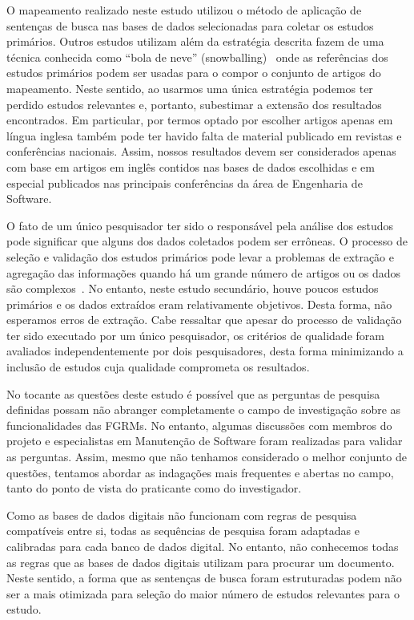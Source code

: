 O mapeamento realizado neste estudo utilizou o método de aplicação de sentenças
de busca nas bases de dados selecionadas para coletar os estudos primários.
Outros estudos utilizam além da estratégia descrita fazem de uma técnica
conhecida  como ``bola de neve'' (snowballing)~\cite{wohlin2014guidelines} onde
as referências dos estudos primários podem ser usadas para o compor o conjunto
de artigos do mapeamento. Neste sentido, ao usarmos uma única estratégia podemos
ter perdido estudos relevantes e, portanto, subestimar a extensão dos resultados
encontrados. Em particular, por termos optado por escolher artigos apenas em
língua inglesa também pode ter havido falta de material publicado em revistas e
conferências nacionais. Assim, nossos resultados devem ser considerados apenas
com base em artigos em inglês contidos nas bases de dados escolhidas  e em
especial publicados nas principais conferências da área de Engenharia de
Software.

O fato de um único pesquisador ter sido o responsável pela análise dos estudos
pode significar que alguns dos dados coletados podem ser errôneas. O processo de
seleção e validação dos estudos primários pode levar a problemas de extração e
agregação das informações quando há um grande número de artigos ou os dados são
complexos~\cite{keele2007guidelines}. No entanto, neste estudo secundário, houve
poucos estudos primários e os dados extraídos eram relativamente objetivos.
Desta forma, não esperamos erros de extração. Cabe ressaltar que apesar do
processo de validação ter sido executado por um único pesquisador, os critérios
de qualidade foram avaliados independentemente por dois pesquisadores, desta
forma minimizando a inclusão de estudos cuja qualidade comprometa os resultados.

No tocante as questões deste estudo  é  possível que as perguntas de pesquisa
definidas possam não abranger completamente o campo de investigação sobre as
funcionalidades das FGRMs. No entanto, algumas discussões com membros do
projeto e especialistas em Manutenção de Software foram realizadas para validar
as perguntas. Assim, mesmo que não tenhamos considerado o melhor conjunto de
questões, tentamos abordar as indagações mais frequentes e abertas no campo,
tanto do ponto de vista do praticante como do investigador.

Como as bases de dados digitais não funcionam com regras de pesquisa compatíveis
entre si, todas as sequências de pesquisa foram adaptadas e calibradas para cada
banco de dados digital. No entanto, não conhecemos todas as regras que as bases
de dados digitais utilizam para procurar um documento. Neste sentido, a forma
que as sentenças de busca foram estruturadas podem não ser a mais otimizada para
seleção do maior número de estudos relevantes para o estudo.

